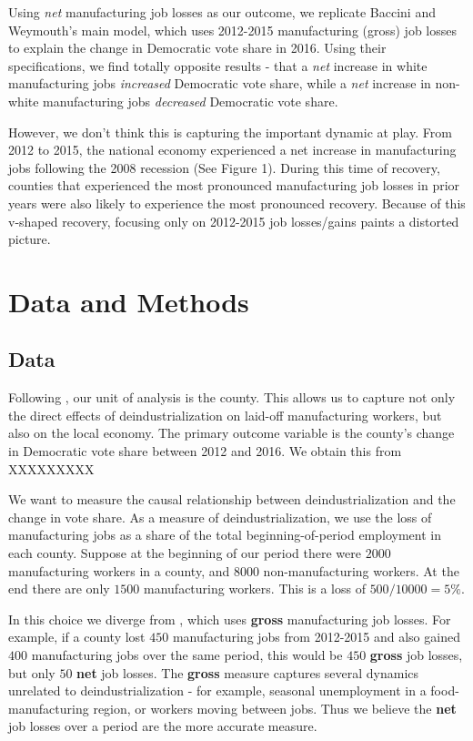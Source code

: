 \documentclass[]{AEA}
\begin{document}
Using \emph{net} manufacturing job losses as our outcome, we replicate
Baccini and Weymouth's main model, which uses 2012-2015 manufacturing
(gross) job losses to explain the change in Democratic vote share in
2016. Using their specifications, we find totally opposite results -
that a \emph{net} increase in white manufacturing jobs \emph{increased}
Democratic vote share, while a \emph{net} increase in non-white
manufacturing jobs \emph{decreased} Democratic vote share.

However, we don't think this is capturing the important dynamic at play.
From 2012 to 2015, the national economy experienced a net increase in
manufacturing jobs following the 2008 recession (See Figure 1). During
this time of recovery, counties that experienced the most pronounced
manufacturing job losses in prior years were also likely to experience
the most pronounced recovery. Because of this v-shaped recovery,
focusing only on 2012-2015 job losses/gains paints a distorted picture.

\section{Data and Methods}

\subsection{Data}

Following \cite{BW21}, our unit of analysis is the county. This allows
us to capture not only the direct effects of deindustrialization on
laid-off manufacturing workers, but also on the local economy. The
primary outcome variable is the county's change in Democratic vote share
between 2012 and 2016. We obtain this from XXXXXXXXX

We want to measure the causal relationship between deindustrialization
and the change in vote share. As a measure of deindustrialization, we
use the loss of manufacturing jobs as a share of the total
beginning-of-period employment in each county. Suppose at the beginning
of our period there were \(2000\) manufacturing workers in a county, and
\(8000\) non-manufacturing workers. At the end there are only \(1500\)
manufacturing workers. This is a loss of \(500/10000 = 5\%.\)

In this choice we diverge from \cite{BW21}, which uses \textbf{gross}
manufacturing job losses. For example, if a county lost \(450\)
manufacturing jobs from 2012-2015 and also gained \(400\) manufacturing
jobs over the same period, this would be \(450\) \textbf{gross} job
losses, but only \(50\) \textbf{net} job losses. The \textbf{gross}
measure captures several dynamics unrelated to deindustrialization - for
example, seasonal unemployment in a food-manufacturing region, or
workers moving between jobs. Thus we believe the \textbf{net} job losses
over a period are the more accurate measure.
\end{document}
